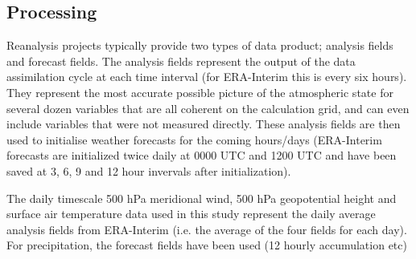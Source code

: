 \subsection{Processing}

Reanalysis projects typically provide two types of data product; analysis fields and forecast fields. The analysis fields represent the output of the data assimilation cycle at each time interval (for ERA-Interim this is every six hours). They represent the most accurate possible picture of the atmospheric state for several dozen variables that are all coherent on the calculation grid, and can even include variables that were not measured directly. These analysis fields are then used to initialise weather forecasts for the coming hours/days (ERA-Interim forecasts are initialized twice daily at 0000 UTC and 1200 UTC and have been saved at 3, 6, 9 and 12 hour invervals after initialization).  

The daily timescale 500 hPa meridional wind, 500 hPa geopotential height and surface air temperature data used in this study represent the daily average analysis fields from ERA-Interim (i.e. the average of the four fields for each day). For precipitation, the forecast fields have been used (12 hourly accumulation etc) 